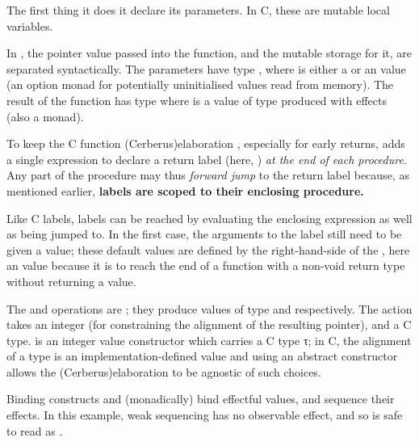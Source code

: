 The first thing it does it declare its parameters. In C, these are mutable
local variables.


In , the pointer value passed into the function, and the mutable storage
for it, are separated syntactically. The parameters have type
, where  is either a
 or an  value %
(an option monad for potentially uninitialised values read from memory). The
result of the function has type  where
 is a value of type  produced with effects
(also a monad).


To keep the C function \kl(Cerberus){elaboration} , especially for early returns,
 adds a single 
expression to declare a return label (here, ) \emph{at the
end of each procedure}. Any part of the procedure may thus \emph{forward jump}
to the return label because, as mentioned earlier, \textbf{labels are scoped to
their enclosing procedure.}

Like C labels,  labels can be reached by evaluating the enclosing
expression as well as being jumped to. In the first case, the arguments to the
label still need to be given a value; these default values are defined by the
right-hand-side of the \coreinline{:=}, here an 
value because it is  to reach the end of a function with a non-void
return type without returning a value.


The  and  operations are
; they produce values of type  and
 respectively. The  action
takes an integer (for constraining the alignment of the
resulting pointer), and a C type.  is an
integer value constructor which carries a C type τ; in C, the
alignment of a type is an implementation-defined value and using an abstract
constructor allows the \kl(Cerberus){elaboration} to be agnostic of such choices.

Binding constructs  and 
(monadically) bind effectful values, and sequence their effects. In this
example, weak sequencing has no observable effect, and so is safe to read as
.


